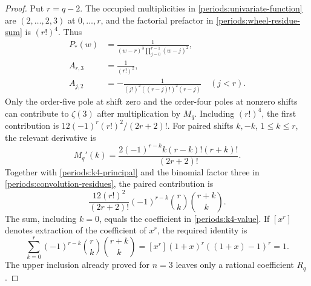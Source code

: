 \begin{proof}
Put $r=q-2$.  The occupied multiplicities in
\eqref{periods:univariate-function} are $(2,\ldots,2,3)$ at
$0,\ldots,r$, and the factorial prefactor in
\eqref{periods:wheel-residue-sum} is $(r!)^4$.  Thus
\begin{equation}
 \begin{aligned}
 P_*(w)&=\frac1{(w-r)^3\prod_{j=0}^{r-1}(w-j)^2},\\
 A_{r,3}&=\frac1{(r!)^2},\\
 A_{j,2}&=-\frac1{(j!)^2((r-j)!)^2(r-j)}\quad(j<r).
 \end{aligned}
 \label{periods:k4-principal}
\end{equation}
Only the order-five pole at shift zero and the order-four poles at
nonzero shifts can contribute to $\zeta(3)$ after multiplication by
$M_q$.  Including $(r!)^4$, the first contribution is
$12(-1)^r(r!)^2/(2r+2)!$.  For paired shifts $k,-k$, $1\le k\le r$,
the relevant derivative is
\begin{equation}
 M_q'(k)=\frac{2(-1)^{r-k}k(r-k)!(r+k)!}{(2r+2)!}.
 \label{periods:multiplicity-derivative}
\end{equation}
Together with \eqref{periods:k4-principal} and the binomial factor three
in \eqref{periods:convolution-residues}, the paired contribution is
\begin{equation}
 \frac{12(r!)^2}{(2r+2)!}
 (-1)^{r-k}\binom rk\binom{r+k}{k}.
 \label{periods:paired-k4-contribution}
\end{equation}
The sum, including $k=0$, equals the coefficient in
\eqref{periods:k4-value}.  If $[x^r]$ denotes extraction of the
coefficient of $x^r$, the required identity is
\begin{equation}
 \sum_{k=0}^r(-1)^{r-k}\binom rk\binom{r+k}{k}
 =[x^r](1+x)^r((1+x)-1)^r=1.
 \label{periods:binomial-one}
\end{equation}
The upper inclusion already proved for $n=3$ leaves only a rational
coefficient $R_q$.


\end{proof}
